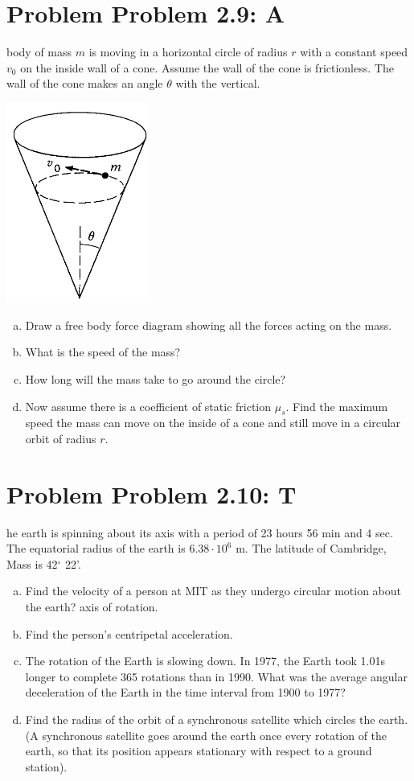 \documentclass[problems]{esg8012pset}
\begin{document}
\section*{Problem Problem 2.9: A}
 body of mass $m$ is moving in a horizontal circle of radius $r$ with a constant speed $v_0$ on the inside wall of a cone. Assume the wall of the cone is frictionless. The wall of the cone makes an angle $\theta$ with the vertical.
  \begin{center}\includegraphics[width=0.35\textwidth]{ps02_3}\end{center}
  \begin{enumerate}[a)]
    \item Draw a free body force diagram showing all the forces acting on the mass.
    \item What is the speed of the mass?
    \item How long will the mass take to go around the circle?
    \item Now assume there is a coefficient of static friction $\mu_s$. Find the maximum speed the mass can move on the inside of a cone and still move in a circular orbit of radius $r$.
  \end{enumerate}
\section*{Problem Problem 2.10: T}
he earth is spinning about its axis with a period of 23 hours 56 min and 4 sec. The equatorial radius of the earth is $6.38\cdot 10^{6}$ m. The latitude of Cambridge, Mass is 42$^{\circ}$ 22'.
  \begin{enumerate}[a)]
    \item Find the velocity of a person at MIT as they undergo circular motion about the earth? axis of rotation.
    \item Find the person's centripetal acceleration.
    \item The rotation of the Earth is slowing down. In 1977, the Earth took 1.01s longer to complete 365 rotations than in 1990. What was the average angular deceleration of the Earth in the time interval from 1900 to 1977?
    \item Find the radius of the orbit of a synchronous satellite which circles the earth. (A synchronous satellite goes around the earth once every rotation of the earth, so that its position appears stationary with respect to a ground station).
  \end{enumerate}
\end{document}
